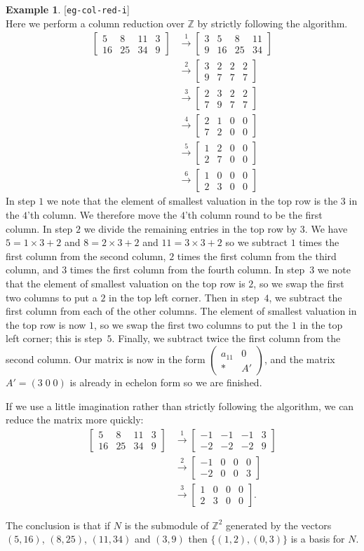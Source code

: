\documentclass{amsart}
\newcommand{\lbl}[1]{\label{#1}\textup{[\texttt{#1}]}\ \\}
\newcommand{\lbl}{\label}
\newcommand{\bbm}       {\left[\begin{matrix}}
\newcommand{\ebm}       {\end{matrix}\right]}
\newcommand{\Z}         {{\mathbb{Z}}}
\newcommand{\tm}        {\times}
\newcommand{\xra}       {\xrightarrow}
\newcommand{\blockmat}[4]{
 \left(\begin{array}{c|c} #1&#2 \\ \hline #3&#4\end{array}\right)}
\renewcommand{\:}{\colon}
\theoremstyle{definition}
\newtheorem{example}[theorem]{Example}
\begin{document}
\begin{example}\lbl{eg-col-red-i}
 Here we perform a column reduction over $\Z$ by strictly following the
 algorithm.
 \begin{align*}
           \bbm 5&8&11&3 \\ 16&25&34&9 \ebm
  &\xra{1} \bbm 3&5&8&11 \\ 9&16&25&34 \ebm \\
  &\xra{2} \bbm 3&2&2&2  \\ 9&7&7&7 \ebm \\
  &\xra{3} \bbm 2&3&2&2  \\ 7&9&7&7 \ebm \\
  &\xra{4} \bbm 2&1&0&0  \\ 7&2&0&0 \ebm \\
  &\xra{5} \bbm 1&2&0&0  \\ 2&7&0&0 \ebm \\
  &\xra{6} \bbm 1&0&0&0  \\ 2&3&0&0 \ebm
 \end{align*}
 In step $1$ we note that the element of smallest valuation in the top
 row is the $3$ in the $4$'th column.  We therefore move the $4$'th
 column round to be the first column.  In step $2$ we divide the
 remaining entries in the top row by $3$.  We have $5=1\tm 3+2$ and
 $8=2\tm 3+2$ and $11=3\tm 3+2$ so we subtract $1$ times the first
 column from the second column, $2$ times the first column from the
 third column, and $3$ times the first column from the fourth column.
 In step~$3$ we note that the element of smallest valuation on the top
 row is $2$, so we swap the first two columns to put a $2$ in the top
 left corner.  Then in step~$4$, we subtract the first column from
 each of the other columns.  The element of smallest valuation in the
 top row is now $1$, so we swap the first two columns to put the $1$
 in the top left corner; this is step~$5$.  Finally, we subtract twice
 the first column from the second column.  Our matrix is now in the
 form $\blockmat{a_{11}}{0}{*}{A'}$, and the matrix $A'=(3\;0\;0)$ is
 already in echelon form so we are finished.

 If we use a little imagination rather than strictly following the
 algorithm, we can reduce the matrix more quickly:
 \begin{align*}
           \bbm 5&8&11&3 \\ 16&25&34&9 \ebm
  &\xra{1} \bbm -1&-1&-1&3 \\ -2&-2&-2&9 \ebm \\
  &\xra{2} \bbm -1&0&0&0  \\ -2&0&0&3 \ebm \\
  &\xra{3} \bbm 1&0&0&0  \\ 2&3&0&0 \ebm.
 \end{align*}

 The conclusion is that if $N$ is the submodule of $\Z^2$ generated by
 the vectors $(5,16)$, $(8,25)$, $(11,34)$ and $(3,9)$ then
 $\{(1,2),(0,3)\}$ is a basis for $N$.
\end{example}
\end{document}
